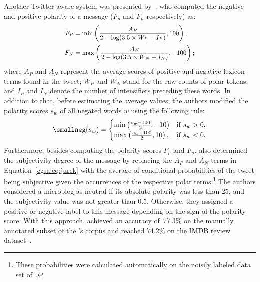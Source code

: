 Another Twitter-aware system was presented by~\citet{Jurek:15}, who
computed the negative and positive polarity of a message ($F_p$ and
$F_n$ respectively) as:
\begin{align}
  \small
  \begin{split}
  F_P &= \min\left(\frac{A_P}{2 - \log(3.5\times W_P + I_P)}, 100\right),\\
  F_N &= \max\left(\frac{A_N}{2 - \log(3.5\times W_N + I_N)}, -100\right);\label{cgsa:eq:jurek}
  \end{split}
\end{align}%
where $A_P$ and $A_N$ represent the average scores of positive and
negative lexicon terms found in the tweet; $W_P$ and $W_N$ stand for
the raw counts of polar tokens; and $I_P$ and $I_N$ denote the number
of intensifiers preceding these words.  In addition to that, before
estimating the average values, the authors modified the polarity
scores $s_w$ of all negated words $w$ using the following rule:
\begin{align*}
  \small%
neg(s_w) =
    \begin{cases}
        \min\left(\frac{s_w - 100}{2}, -10\right) & \text{if } s_w > 0,\\
        \max\left(\frac{s_w + 100}{2}, 10\right), & \text{if } s_w < 0.
    \end{cases}
\end{align*}%
Furthermore, besides computing the polarity scores $F_p$ and $F_n$,
\citeauthor{Jurek:15} also determined the subjectivity degree of the
message by replacing the $A_P$ and $A_N$ terms in
Equation~\ref{cgsa:eq:jurek} with the average of conditional
probabilities of the tweet being subjective given the occurrences of
the respective polar terms.\footnote{These probabilities were
  calculated automatically on the noisily labeled data set
  of~\citet{Go:09}.}  The authors considered a microblog as neutral if
its absolute polarity was less than 25, and the subjectivity value was
not greater than 0.5.  Otherwise, they assigned a positive or negative
label to this message depending on the sign of the polarity score.
With this approach, \citeauthor{Jurek:15} achieved an accuracy
of~77.3\% on the manually annotated subset of the \citeauthor{Go:09}'s
corpus and reached 74.2\% on the IMDB review dataset~\cite{Maas:11}.

